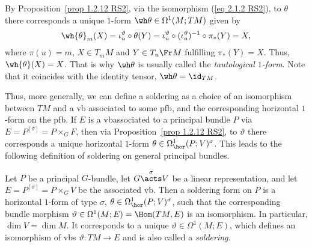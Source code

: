 \begin{rem}
    By Proposition~\ref{prop 1.2.12 RS2}, via the isomorphism (\ref{eq 2.1.2 RS2}), to $\theta$ there corresponds a unique $1$-form $\wh\theta\in\Omega^1(M;TM)$ given by
    \[\wh{\theta}_m(X)=\iota_u^\vartheta\circ \theta(Y)=\iota_u^\vartheta\circ (\iota_u^\vartheta)^{-1}\circ\pi_\ast(Y)=X,\]
    where $\pi(u)=m$, $X\in T_mM$ and $Y\in T_u\Fr M$ fulfilling $\pi_\ast(Y)=X$. Thus, $\wh{\theta}(X)=X$. That is why $\wh\theta$ is usually called the \emph{tautological $1$-form}. Note that it coincides with the identity tensor, $\wh\theta=\id_{TM}$.
\end{rem}

Thus, more generally, we can define a soldering as a choice of an isomorphism between $TM$ and a \gls{vb} associated to some \gls{pfb}, and the corresponding horizontal $1$-form on the \gls{pfb}. If $E$ is a \gls{vb}associated to a principal bundle $P$ via $E=P^{[\sigma]}=P\times_G F$, then via Proposition~\ref{prop 1.2.12 RS2}, to $\vartheta$ there corresponds a unique horizontal $1$-form $\theta\in\Omega^1_{\hor}(P;V)^\sigma$. This leads to the following definition of soldering on general principal bundles.

\begin{defn}
    Let $P$ be a principal $G$-bundle, let $G\overset{\sigma}{\acts}V$ be a linear representation, and let $E=P^{[\sigma]}=P\times_G V$ be the associated \gls{vb}. Then a soldering form on $P$ is a horizontal $1$-form of type $\sigma$, $\theta\in\Omega^1_{\hor}(P;V)^\sigma$, such that the corresponding bundle morphism $\vartheta\in \Omega^1(M;E)=\Hom(TM,E)$ is an isomorphism. In particular, $\dim V=\dim M$. It corresponds to a unique $\vartheta\in\Omega^1(M; E)$, which defines an isomorphism of \glspl{vb} $\vartheta:TM\to E$ and is also called a \emph{soldering}.
\end{defn}



